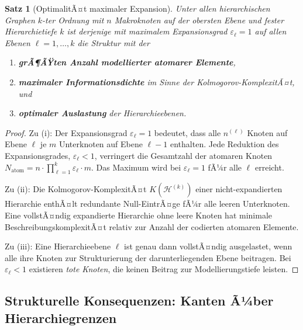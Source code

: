 ﻿\documentclass[12pt,a4paper,twoside]{article}
\theoremstyle{definition}
\theoremstyle{plain}
\newtheorem{theorem}{Satz}[section]
\theoremstyle{remark}
\begin{document}
\begin{theorem}[OptimalitÃ¤t maximaler Expansion]
	\label{thm:optexpansion}
	Unter allen hierarchischen Graphen $k$-ter Ordnung mit $n$ Makroknoten
	auf der obersten Ebene und fester Hierarchietiefe $k$ ist derjenige
	mit maximalem Expansionsgrad $\varepsilon_\ell = 1$ auf allen Ebenen
	$\ell = 1, \ldots, k$ die Struktur mit der
	\begin{enumerate}[label=\textbf{(\roman*)}]
		\item \textbf{grÃ¶ÃŸten Anzahl modellierter atomarer Elemente},
		\item \textbf{maximaler Informationsdichte} im Sinne der
		Kolmogorov-KomplexitÃ¤t, und
		\item \textbf{optimaler Auslastung} der Hierarchieebenen.
	\end{enumerate}
\end{theorem}

\begin{proof}
	Zu (i): Der Expansionsgrad $\varepsilon_\ell = 1$ bedeutet, dass alle
	$n^{(\ell)}$ Knoten auf Ebene $\ell$ je $m$ Unterknoten auf Ebene
	$\ell-1$ enthalten.  Jede Reduktion des Expansionsgrades,
	$\varepsilon_\ell < 1$, verringert die Gesamtzahl der atomaren Knoten
	$N_{\text{atom}} = n \cdot \prod_{\ell=1}^{k} \varepsilon_\ell \cdot m$.
	Das Maximum wird bei $\varepsilon_\ell = 1$ fÃ¼r alle $\ell$ erreicht.
	
	Zu (ii): Die Kolmogorov-KomplexitÃ¤t $K(\mathcal{H}^{(k)})$ einer
	nicht-expandierten Hierarchie enthÃ¤lt redundante Null-EintrÃ¤ge fÃ¼r
	alle leeren Unterknoten.  Eine vollstÃ¤ndig expandierte Hierarchie
	ohne leere Knoten hat minimale BeschreibungskomplexitÃ¤t relativ zur
	Anzahl der codierten atomaren Elemente.
	
	Zu (iii): Eine Hierarchieebene $\ell$ ist genau dann vollstÃ¤ndig
	ausgelastet, wenn alle ihre Knoten zur Strukturierung der darunterliegenden
	Ebene beitragen.  Bei $\varepsilon_\ell < 1$ existieren \emph{tote Knoten},
	die keinen Beitrag zur Modellierungstiefe leisten.\qquad
\end{proof}

\subsection{Strukturelle Konsequenzen: Kanten Ã¼ber Hierarchiegrenzen}
\label{sub:interedges}
\end{document}

